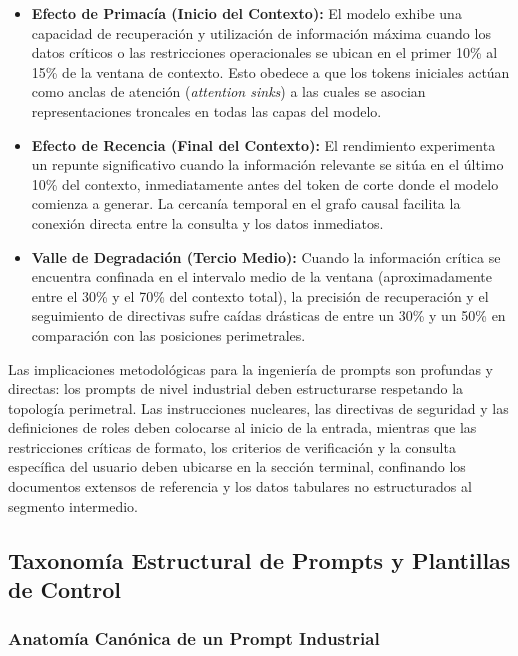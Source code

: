 \begin{itemize}
    \item \textbf{Efecto de Primacía (Inicio del Contexto):} El modelo exhibe una capacidad de recuperación y utilización de información máxima cuando los datos críticos o las restricciones operacionales se ubican en el primer 10\% al 15\% de la ventana de contexto. Esto obedece a que los tokens iniciales actúan como anclas de atención (\textit{attention sinks}) a las cuales se asocian representaciones troncales en todas las capas del modelo.
    \item \textbf{Efecto de Recencia (Final del Contexto):} El rendimiento experimenta un repunte significativo cuando la información relevante se sitúa en el último 10\% del contexto, inmediatamente antes del token de corte donde el modelo comienza a generar. La cercanía temporal en el grafo causal facilita la conexión directa entre la consulta y los datos inmediatos.
    \item \textbf{Valle de Degradación (Tercio Medio):} Cuando la información crítica se encuentra confinada en el intervalo medio de la ventana (aproximadamente entre el 30\% y el 70\% del contexto total), la precisión de recuperación y el seguimiento de directivas sufre caídas drásticas de entre un 30\% y un 50\% en comparación con las posiciones perimetrales.
\end{itemize}

Las implicaciones metodológicas para la ingeniería de prompts son profundas y directas: los prompts de nivel industrial deben estructurarse respetando la topología perimetral. Las instrucciones nucleares, las directivas de seguridad y las definiciones de roles deben colocarse al inicio de la entrada, mientras que las restricciones críticas de formato, los criterios de verificación y la consulta específica del usuario deben ubicarse en la sección terminal, confinando los documentos extensos de referencia y los datos tabulares no estructurados al segmento intermedio.

\newpage
\subsection{Taxonomía Estructural de Prompts y Plantillas de Control}

\subsubsection{Anatomía Canónica de un Prompt Industrial}

